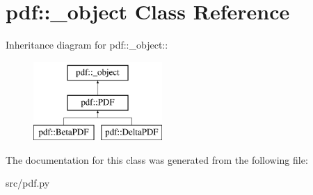 \hypertarget{classpdf_1_1__object}{
\section{pdf::\_\-object Class Reference}
\label{df/d35/classpdf_1_1__object}
}
Inheritance diagram for pdf::\_\-object::\begin{figure}[H]
\begin{center}
\leavevmode
\includegraphics[height=3cm]{df/d35/classpdf_1_1__object}
\end{center}
\end{figure}


The documentation for this class was generated from the following file:\begin{DoxyCompactItemize}
\item 
src/pdf.py\end{DoxyCompactItemize}
